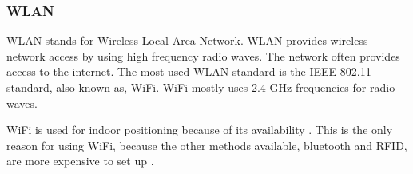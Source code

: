 \subsubsection{WLAN}\label{wifi}
WLAN stands for Wireless Local Area Network.
WLAN provides wireless network access by using high frequency radio waves.
The network often provides access to the internet.
The most used WLAN standard is the IEEE 802.11 standard\cite{ieee_wifi_standard}, also known as, WiFi.
WiFi mostly uses 2.4 GHz frequencies for radio waves\cite{ieee_wifi_standard}.


WiFi is used for indoor positioning because of its availability
\cite{indoor_maps_google_slides}\cite{improving_wifi_using_bluetooth}.
This is the only reason for using WiFi, because the other methods available, bluetooth and RFID, are more expensive to set up \cite{improving_wifi_using_bluetooth}.